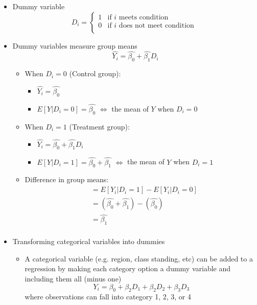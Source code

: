 \documentclass{article}
\begin{document}
\begin{itemize}
	\item Dummy variable 		\[D_i = \left\{
 		 \begin{array}{ll}
    		1 & \text{if } i \text{ meets  condition} \\
   			0 & \text{if } i \text{ does not meet condition }\\
  		\end{array}
  		\right.
		\]
	\item Dummy variables measure group means 
		\begin{equation*}
	\hat{Y_i}=\hat{\beta_0}+\hat{\beta_1} D_i
	\end{equation*}
	\begin{itemize}
		\item When $D_i=0$ (Control group):
		\begin{itemize}
			\item $\hat{Y_i}=\hat{\beta_0}$
			\item $E[Y|D_i=0]=\hat{\beta_0}$ $\iff$ the mean of $Y$ when $D_i=0$
		\end{itemize}
		\item When $D_i=1$ (Treatment group):
		\begin{itemize}
			\item $\hat{Y_i}=\hat{\beta_0}+\hat{\beta_1} D_i$
			\item $E[Y|D_i=1]=\hat{\beta_0}+\hat{\beta_1}$ $\iff$ the mean of $Y$ when $D_i=1$
		\end{itemize}
		\item Difference in group means:
		\begin{align*}
		&=E[Y_i|D_i=1]-E[Y_i|D_i=0]\\
		&=(\hat{\beta_0}+\hat{\beta_1})-(\hat{\beta_0})\\
		&=\hat{\beta_1}\\
		\end{align*}
	\end{itemize}
	\item Transforming categorical variables into dummies 
	\begin{itemize}
		\item A categorical variable (e.g. region, class standing, etc) can be added to a regression by making each category option a dummy variable and including them all (minus one) 
		\begin{equation*}
		Y_i=\beta_0+\beta_2 D_1 + \beta_2 D_2 + \beta_3 D_3	
		\end{equation*}
		where observations can fall into category 1, 2, 3, or 4

\end{itemize}
\end{itemize}
\end{document}
